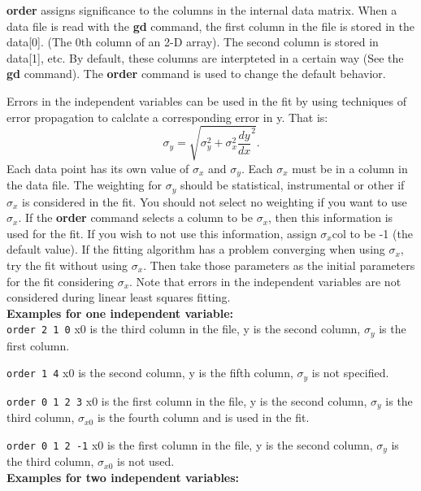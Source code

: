        {\bf order} assigns significance to the columns in the
 internal data matrix.  When a data file is read with the {\bf gd } 
 command, the first column in the file is stored in the 
 data[0].  (The 0th column of an 2-D array).  The second 
 column is stored in data[1], etc.  By default, these columns
 are interpteted in a certain way (See the {\bf gd } command).  The
 {\bf order} command is used to change the default behavior.

 Errors in the independent variables can be used in the fit 
 by using techniques of error propagation to calclate a 
 corresponding error in y.  That is:
\begin{displaymath}
 \sigma_y = \sqrt{ \sigma_y^2 + \sigma_x^2 \frac{dy}{dx}^2 }.
\end{displaymath}
 Each data point has its own value of $\sigma_x$ and $\sigma_y$.
 Each $\sigma_x$ must be in a column in the data file.  The
 weighting for $\sigma_y$ should be statistical, instrumental or
 other if $\sigma_x$ is considered in the fit.  You should not
 select no weighting if you want to use $\sigma_x$.  If the {\bf order}
 command selects a column to be $\sigma_x$, then this information
 is used for the fit.  If you wish to not use this 
 information, assign $\sigma_x$col to be -1 (the default value).
        If the fitting algorithm has a problem converging
 when using $\sigma_x$, try the fit without using $\sigma_x$.  Then take
 those parameters as the initial parameters for the fit 
 considering $\sigma_x$. Note that errors in the independent
 variables are not considered during linear least squares 
 fitting.
\\

 {\bf Examples for one independent variable:}\\

 {\tt order 2 1 0}  x0 is the third column in the file, y is the
 second column, $\sigma_y$ is the first column.

 {\tt order 1 4} x0 is the second column, y is the fifth column,
 $\sigma_y$ is not specified.

 {\tt order 0 1 2 3} x0 is the first column in the file, y is
 the second column, $\sigma_y$ is the third column, $\sigma_{x0}$ is the
 fourth column and is used in the fit.

 {\tt order 0 1 2 -1} x0 is the first column in the file, y is
 the second column, $\sigma_y$ is the third column, $\sigma_{x0}$ is not
 used.
\\

 {\bf Examples for two independent variables:}\\

